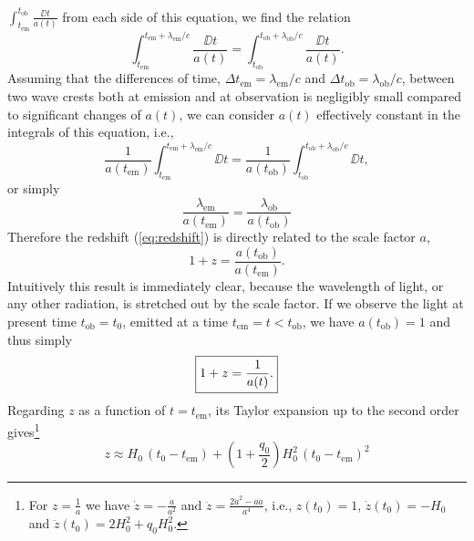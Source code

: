 $ %
	\int_{t_{\mathrm{em}}}^{t_{\mathrm{ob}}} \frac{\DD t}{a(t)}
$ %
from each side of this equation, we find the relation
\begin{equation}
	\int_{t_{\mathrm{em}}}^{t_{\mathrm{em}} + \lambda_{\mathrm{em}}/c} \frac{\DD t}{a(t)}
	=
	\int_{t_{\mathrm{ob}}}^{t_{\mathrm{ob}} + \lambda_{\mathrm{ob}}/c} \frac{\DD t}{a(t)}
	.
\end{equation}
Assuming that the differences of time, $\Delta t_{\mathrm{em}} = \lambda_{\mathrm{em}}/c$ and $\Delta t_{\mathrm{ob}} = \lambda_{\mathrm{ob}}/c$,
between two wave crests both at emission and at observation is negligibly small compared to significant changes of $a(t)$, we can consider $a(t)$ effectively constant in the integrals of this equation, i.e.,
\begin{equation}
	\frac{1}{a(t_{\mathrm{em}})} \int_{t_{\mathrm{em}}}^{t_{\mathrm{em}} + \lambda_{\mathrm{em}}/c} \DD t
	=
	\frac{1}{a(t_{\mathrm{ob}})} \int_{t_{\mathrm{ob}}}^{t_{\mathrm{ob}} + \lambda_{\mathrm{ob}}/c} \DD t
	,
\end{equation}
or simply
\begin{equation}
	\frac{\lambda_{\mathrm{em}}}{a(t_{\mathrm{em}})}
	= \frac{\lambda_{\mathrm{ob}}}{a(t_{\mathrm{ob}})}
\end{equation}
Therefore the redshift (\ref{eq:redshift}) is directly related to the scale factor $a$,
\begin{equation}
	1 + z 
	= \frac{a(t_{\mathrm{ob}})}{a(t_{\mathrm{em}})}
	.
\end{equation}
Intuitively this result is immediately clear, because the wavelength of light, or any other radiation, is stretched out by the scale factor.
If we observe the light at present time $t_{\mathrm{ob}} = t_0$, emitted at a time $t_{\mathrm{em}} = t < t_{\mathrm{ob}}$, we have $a(t_{\mathrm{ob}}) = 1$ and thus simply
\begin{equation}
	\fbox{$\displaystyle
	1 + z 
	= \frac{1}{a(t)}
	.
	$} %
	\label{eq:FLRW-redshift-scale-factor}
\end{equation}
Regarding $z$ as a function of $t = t_{\mathrm{em}}$, its Taylor expansion up to the second order gives\footnote{
	For $z = \frac{1}{a}$ we have $\dot{z} = - \frac{\dot{a}}{a^2}$ and $\ddot{z} = \frac{2 \dot{a}^2 - a \ddot{a}}{a^4}$, i.e.,
	$z(t_0) = 1$, $\dot{z}(t_0) = - H_0$ and $\ddot{z}(t_0) = 2 H_0^2 + q_0 H_0^2$.
}
\begin{equation}
	z
	\approx
	H_0 \, (t_0 - t_{\mathrm{em}}) + \left( 1 + \frac{q_0}{2} \right) H_0^2 \, (t_0 - t_{\mathrm{em}})^2
	\label{eq:z-H0-q0}
\end{equation}
